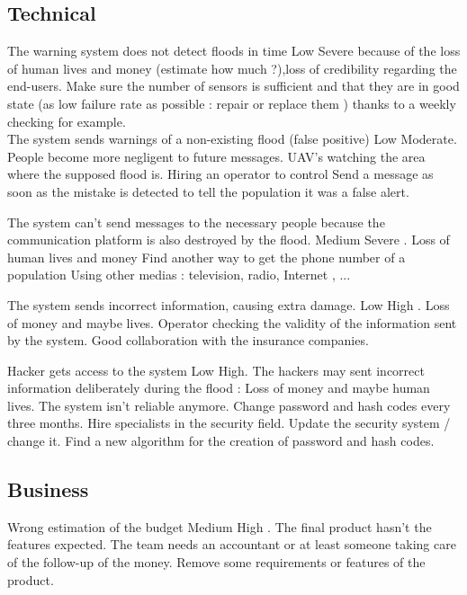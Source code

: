 \subsection{Technical}

{The warning system does not detect floods in time}
{Low}
{Severe because of the loss of human lives and money (estimate how much ?),loss of credibility regarding the end-users.}
{Make sure the number of sensors is sufficient and that they are in good state (as low failure rate as possible : repair or replace them ) thanks to a weekly checking for example.}
{ }
~\\[0.1cm]

{The system sends warnings of a non-existing flood (false positive)} %
{Low}
{Moderate. People become more negligent to future messages.}
{UAV's watching the area where the supposed flood is. Hiring an operator to control}
{Send a message as soon as the mistake is detected to tell the population it was a false alert. }

{The system can't send messages to the necessary people because the communication platform is also destroyed by the flood.}
{Medium}
{Severe . Loss of human lives and money }
{Find another way to get the phone number of a population}
{Using other medias : television, radio, Internet , ... }
	
{The system sends incorrect information, causing extra damage.}
{Low}
{High . Loss of money and maybe lives.}
{Operator checking the validity of the information sent by the system.
	Good collaboration with the insurance companies.}
{  }

{Hacker gets access to the system}
{Low}
{High. The hackers may sent incorrect information deliberately during the flood : Loss of money and maybe human lives. The system isn't reliable anymore.}
{Change password and hash codes every three months. Hire specialists in the security field.}
{Update the security system / change it. Find a new algorithm for the creation of password and hash codes.}



\subsection{Business}

{Wrong estimation of the budget}
{Medium}
{High . The final product hasn't the features expected.}
{The team needs an accountant or at least someone taking care of the follow-up of the money.}
{Remove some requirements or features of the product.}

